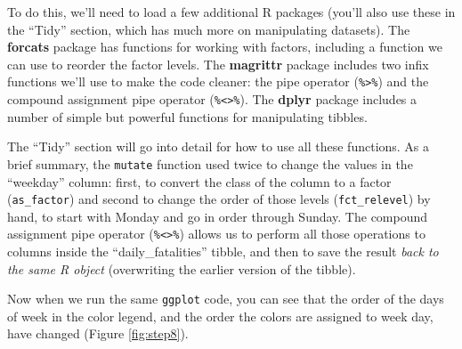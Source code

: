 \documentclass[]{tufte-book}
\newenvironment{Shaded}{}{}
\newcommand{\DataTypeTok}[1]{\textcolor[rgb]{0.56,0.13,0.00}{#1}}
\newcommand{\KeywordTok}[1]{\textcolor[rgb]{0.00,0.44,0.13}{\textbf{#1}}}
\newcommand{\NormalTok}[1]{#1}
\newcommand{\OperatorTok}[1]{\textcolor[rgb]{0.40,0.40,0.40}{#1}}
\newcommand{\StringTok}[1]{\textcolor[rgb]{0.25,0.44,0.63}{#1}}
\begin{document}
To do this, we'll need to load a few additional R packages (you'll also use these
in the ``Tidy'' section, which has much more on manipulating datasets). The
\textbf{forcats} package \citep{R-forcats} has functions for working with factors, including
a function we can use to reorder the factor levels. The \textbf{magrittr} package
\citep{R-magrittr} includes two infix functions we'll use to make the code
cleaner: the pipe operator (\texttt{\%\textgreater{}\%}) and the compound assignment pipe operator (\texttt{\%\textless{}\textgreater{}\%}).
The \textbf{dplyr} package \citep{R-dplyr} includes a number of simple but powerful functions
for manipulating tibbles.

The ``Tidy'' section will go into detail for how to use all these functions. As a brief
summary, the \texttt{mutate} function used twice to change the values in the ``weekday'' column:
first, to convert the class of the column to a factor (\texttt{as\_factor}) and second to
change the order of those levels (\texttt{fct\_relevel}) by hand, to start with Monday and
go in order through Sunday. The compound assignment pipe operator (\texttt{\%\textless{}\textgreater{}\%}) allows
us to perform all those operations to columns inside the ``daily\_fatalities'' tibble,
and then to save the result \emph{back to the same R object} (overwriting the earlier
version of the tibble).

\begin{Shaded}
\end{Shaded}

Now when we run the same \texttt{ggplot} code, you can see that the order of the days of
week in the color legend, and the order the colors are assigned to week day, have
changed (Figure \ref{fig:step8}).
\end{document}
